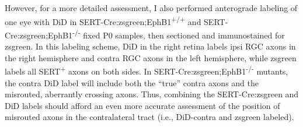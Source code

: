 However, for a more detailed assessment, I also performed anterograde labeling of one eye with DiD in SERT-Cre:zsgreen;EphB1\textsuperscript{+/+} and SERT-Cre:zsgreen;EphB1\textsuperscript{-/-} fixed P0 samples, then sectioned and immunostained for zsgreen.
In this labeling scheme, DiD in the right retina labels ipsi RGC axons in the right hemisphere and contra RGC axons in the left hemisphere, while zsgreen labels all SERT\textsuperscript{+} axons on both sides. 
In SERT-Cre:zsgreen;EphB1\textsuperscript{-/-} mutants, the contra DiD label will include both the ``true'' contra axons and the misrouted, aberrantly crossing axons.
Thus, combining the SERT-Cre:zsgreen and DiD labels should afford an even more accurate assessment of the position of misrouted axons in the contralateral tract (i.e., DiD-contra and zsgreen labeled).

